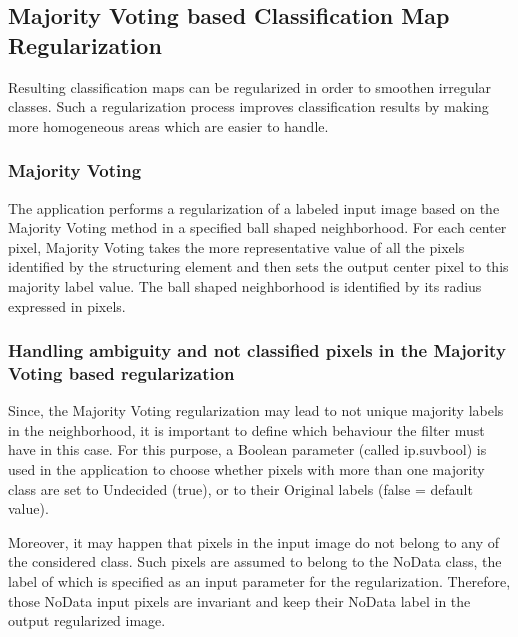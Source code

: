 \subsection{Majority Voting based Classification Map Regularization}\label{ssec:classificationmapregularization}

Resulting classification maps can be regularized in order to smoothen irregular classes. Such a regularization process
improves classification results by making more homogeneous areas which are easier to handle.

\subsubsection{Majority Voting}

The  application performs a regularization of a labeled input image
based on the Majority Voting method in a specified ball shaped neighborhood. For each center pixel, Majority Voting takes the
more representative value of all the pixels identified by the structuring element and then sets the output center pixel
to this majority label value. The ball shaped neighborhood is identified by its radius expressed in pixels.


\subsubsection{Handling ambiguity and not classified pixels in the Majority Voting based regularization}

Since, the Majority Voting regularization may lead to not unique majority labels in the neighborhood, it is important to define
which behaviour the filter must have in this case. For this purpose, a Boolean parameter (called ip.suvbool) is used in the
 application to choose whether pixels with more than one majority class are set to
Undecided (true), or to their Original labels (false = default value).

Moreover, it may happen that pixels in the input image do not belong to any of the considered class. Such pixels are
assumed to belong to the NoData class, the label of which is specified as an input parameter for the regularization. Therefore,
those NoData input pixels are invariant and keep their NoData label in the output regularized image.
 
